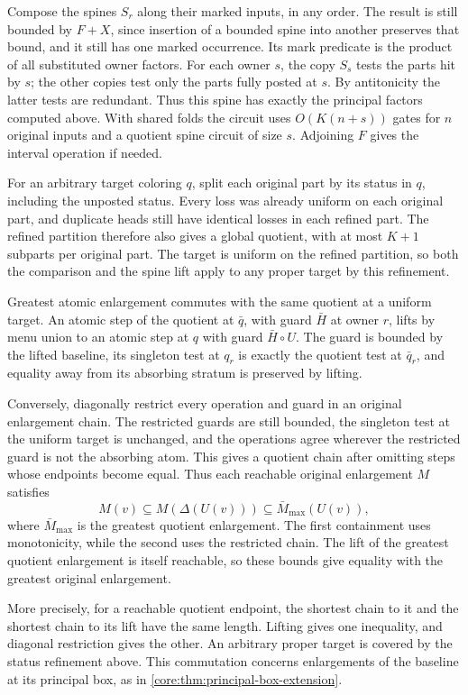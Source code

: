 Compose the spines $S_r$ along their
marked inputs, in any order. The result
is still bounded by $F+X$, since insertion
of a bounded spine into another preserves
that bound, and it still has one marked
occurrence. Its mark predicate is the
product of all substituted owner factors.
For each owner $s$, the copy $S_s$
tests the parts hit by $s$; the other
copies test only the parts fully posted
at $s$. By antitonicity the latter
tests are redundant. Thus this spine
has exactly the principal factors
computed above. With shared folds the
circuit uses $O(K(n+s))$ gates for $n$
original inputs and a quotient spine
circuit of size $s$. Adjoining $F$
gives the interval operation if needed.

For an arbitrary target coloring $q$,
split each original part by its status
in $q$, including the unposted status.
Every loss was already uniform on
each original part, and duplicate
heads still have identical losses
in each refined part. The refined
partition therefore also gives a
global quotient, with at most $K+1$
subparts per original part. The target
is uniform on the refined partition,
so both the comparison and the spine
lift apply to any proper target by
this refinement.

Greatest atomic enlargement commutes with
the same quotient at a uniform target.
An atomic step of the quotient at $\bar q$,
with guard $\bar H$ at owner $r$, lifts by
menu union to an atomic step at $q$ with
guard $\bar H\circ U$. The guard is bounded
by the lifted baseline, its singleton test
at $q_r$ is exactly the quotient test at
$\bar q_r$, and equality away from its
absorbing stratum is preserved by lifting.

Conversely, diagonally restrict every
operation and guard in an original
enlargement chain. The restricted guards
are still bounded, the singleton test at
the uniform target is unchanged, and the
operations agree wherever the restricted
guard is not the absorbing atom. This
gives a quotient chain after omitting
steps whose endpoints become equal.
Thus each reachable original enlargement
$M$ satisfies
\[
           M(v)\subseteq M(\Delta(U(v)))
                  \subseteq \bar M_{\max}(U(v)),
\]
where $\bar M_{\max}$ is the greatest
quotient enlargement. The first containment
uses monotonicity, while the second uses
the restricted chain. The lift of the
greatest quotient enlargement is itself
reachable, so these bounds give equality
with the greatest original enlargement.

More precisely, for a reachable quotient
endpoint, the shortest chain to it and
the shortest chain to its lift have the
same length. Lifting gives one inequality,
and diagonal restriction gives the other.
An arbitrary proper target is covered by
the status refinement above. This
commutation concerns enlargements of the
baseline at its principal box, as in
\cref{core:thm:principal-box-extension}.

